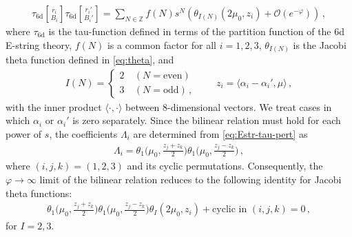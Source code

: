 \documentclass[11pt, a4paper]{article}
\newcommand{\tauftnd}[2]{\tau_{\mathrm{6d}}\genfrac[]{0pt}{1}{#1}{#2}}
\theoremstyle{definition}
\begin{document}
\begin{align}\label{eq:Estr-tau-pert}
    \tauftnd{r_i}{B_i} \tauftnd{r_i'}{B_i'} = \sum_{N\in \mathbb{Z}} f(N) s^N \left( \theta_{I(N)}\left(2\mu_0, z_i \right) + \mathcal{O}(e^{-\varphi}) \right) \, ,
\end{align}
where $ \tau_{\mathrm{6d}} $ is the tau-function defined in terms of the partition function of the 6d E-string theory, $ f(N) $ is a common factor for all $ i=1,2,3 $, $ \theta_{I(N)} $ is the Jacobi theta function defined in \eqref{eq:theta}, and
\begin{align}
    I(N) = \left\{ \begin{array}{ll}
            2 & \ (N=\text{even}) \\
            3 & \ (N=\text{odd}) \, ,
    \end{array}\right.
    \qquad
    z_i = \langle \alpha_i - \alpha_i', \mu \rangle \, ,
\end{align}
with the inner product $ \langle \cdot, \cdot \rangle $ between 8-dimensional vectors. We treat cases in which $ \alpha_i $ or $ \alpha_i' $ is zero separately. Since the bilinear relation must hold for each power of $ s $, the coefficients $ \Lambda_i $ are determined from \eqref{eq:Estr-tau-pert} as
\begin{align}
    \Lambda_i = \theta_1\Big(\mu_0, \frac{z_j+z_k}{2}\Big) \theta_1\Big(\mu_0, \frac{z_j-z_k}{2} \Big) \, , 
\end{align}
where $ (i,j,k)=(1,2,3) $ and its cyclic permutations. Consequently, the $ \varphi \to \infty $ limit of the bilinear relation reduces to the following identity for Jacobi theta functions:
\begin{align}
    \theta_1\Big(\mu_0, \frac{z_j+z_k}{2}\Big) \theta_1\Big(\mu_0, \frac{z_j-z_k}{2}\Big) \theta_I(2\mu_0, z_i) + \text{cyclic in }(i,j,k) = 0 \, ,
\end{align}
for $ I=2, 3 $.
\end{document}
